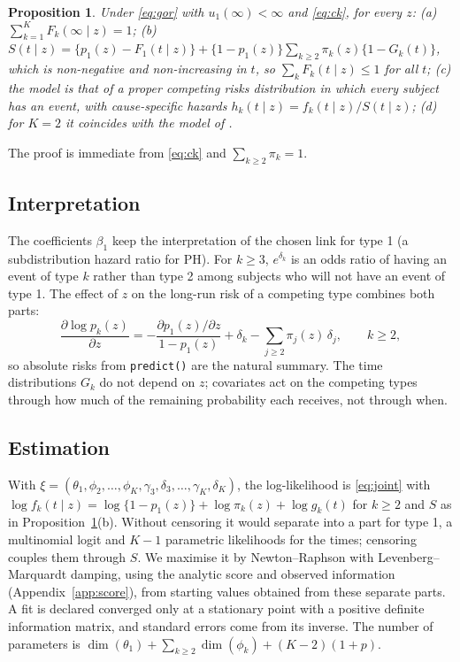 \documentclass[11pt]{article}
\newtheorem{proposition}{Proposition}
\begin{document}
\begin{proposition}\label{prop:coherent}
Under \eqref{eq:gor} with $u_1(\infty) < \infty$ and \eqref{eq:ck}, for every $z$:
(a) $\sum_{k=1}^K F_k(\infty \mid z) = 1$;
(b) $S(t \mid z) = \{p_1(z) - F_1(t \mid z)\} + \{1 - p_1(z)\}\sum_{k \ge 2} \pi_k(z)\{1 - G_k(t)\}$,
which is non-negative and non-increasing in $t$, so $\sum_k F_k(t \mid z) \le 1$ for all $t$;
(c) the model is that of a proper competing risks distribution in which every subject has an
event, with cause-specific hazards $h_k(t \mid z) = f_k(t \mid z)/S(t \mid z)$;
(d) for $K = 2$ it coincides with the model of \citet{shi2013}.
\end{proposition}
The proof is immediate from \eqref{eq:ck} and $\sum_{k \ge 2} \pi_k = 1$.

\subsection{Interpretation}
The coefficients $\beta_1$ keep the interpretation of the chosen link for type 1 (a subdistribution
hazard ratio for PH). For $k \ge 3$, $e^{\delta_k}$ is an odds ratio of having an event of type $k$
rather than type 2 among subjects who will not have an event of type 1. The effect of $z$ on the
long-run risk of a competing type combines both parts:
\[
\frac{\partial \log p_k(z)}{\partial z} = -\frac{\partial p_1(z)/\partial z}{1 - p_1(z)}
 + \delta_k - \sum_{j \ge 2} \pi_j(z)\, \delta_j, \qquad k \ge 2,
\]
so absolute risks from \texttt{predict()} are the natural summary. The time distributions $G_k$
do not depend on $z$; covariates act on the competing types through how much of the remaining
probability each receives, not through when.

\subsection{Estimation}
With $\xi = (\theta_1, \phi_2, \dots, \phi_K, \gamma_3, \delta_3, \dots, \gamma_K, \delta_K)$, the
log-likelihood is \eqref{eq:joint} with
$\log f_k(t \mid z) = \log\{1 - p_1(z)\} + \log \pi_k(z) + \log g_k(t)$ for $k \ge 2$ and $S$ as
in Proposition~\ref{prop:coherent}(b). Without censoring it would separate into a part for
type 1, a multinomial logit and $K - 1$ parametric likelihoods for the times; censoring couples
them through $S$. We maximise it by Newton--Raphson with Levenberg--Marquardt damping, using the
analytic score and observed information (Appendix~\ref{app:score}), from starting values obtained
from these separate parts. A fit is declared converged only at a stationary point with a positive
definite information matrix, and standard errors come from its inverse. The number of parameters
is $\dim(\theta_1) + \sum_{k \ge 2} \dim(\phi_k) + (K - 2)(1 + p)$.
\end{document}
